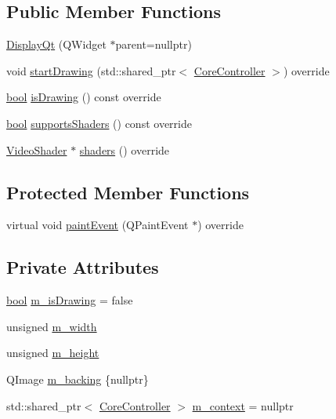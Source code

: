\subsection*{Public Member Functions}
\begin{DoxyCompactItemize}
\item 
\mbox{\hyperlink{class_q_g_b_a_1_1_display_qt_a2ebcca9292027fc84570fd1767cb6aaf}{Display\+Qt}} (Q\+Widget $\ast$parent=nullptr)
\item 
void \mbox{\hyperlink{class_q_g_b_a_1_1_display_qt_adb1dd8630e91d7eb189ea4626fc80465}{start\+Drawing}} (std\+::shared\+\_\+ptr$<$ \mbox{\hyperlink{class_q_g_b_a_1_1_core_controller}{Core\+Controller}} $>$) override
\item 
\mbox{\hyperlink{libretro_8h_a4a26dcae73fb7e1528214a068aca317e}{bool}} \mbox{\hyperlink{class_q_g_b_a_1_1_display_qt_a7c01fcbb5a09686c2e0793039f810c05}{is\+Drawing}} () const override
\item 
\mbox{\hyperlink{libretro_8h_a4a26dcae73fb7e1528214a068aca317e}{bool}} \mbox{\hyperlink{class_q_g_b_a_1_1_display_qt_a48a331d3d100e41168902d62159b9f2f}{supports\+Shaders}} () const override
\item 
\mbox{\hyperlink{video-backend_8h_struct_video_shader}{Video\+Shader}} $\ast$ \mbox{\hyperlink{class_q_g_b_a_1_1_display_qt_a9a92bfeed37ab4ebf5dcad5f573cd9e9}{shaders}} () override
\end{DoxyCompactItemize}
\subsection*{Protected Member Functions}
\begin{DoxyCompactItemize}
\item 
virtual void \mbox{\hyperlink{class_q_g_b_a_1_1_display_qt_a3482e78bcc3c93340cf364ffe57ffa8a}{paint\+Event}} (Q\+Paint\+Event $\ast$) override
\end{DoxyCompactItemize}
\subsection*{Private Attributes}
\begin{DoxyCompactItemize}
\item 
\mbox{\hyperlink{libretro_8h_a4a26dcae73fb7e1528214a068aca317e}{bool}} \mbox{\hyperlink{class_q_g_b_a_1_1_display_qt_ad1b7e6812f698eb280a658deb72ee2b4}{m\+\_\+is\+Drawing}} = false
\item 
unsigned \mbox{\hyperlink{class_q_g_b_a_1_1_display_qt_af80f37bb53492dd016a700988a81830d}{m\+\_\+width}}
\item 
unsigned \mbox{\hyperlink{class_q_g_b_a_1_1_display_qt_abf50393c899793dd6ee939f37a20e43d}{m\+\_\+height}}
\item 
Q\+Image \mbox{\hyperlink{class_q_g_b_a_1_1_display_qt_a39ed336e6d5b179d93b0260d4f27b178}{m\+\_\+backing}} \{nullptr\}
\item 
std\+::shared\+\_\+ptr$<$ \mbox{\hyperlink{class_q_g_b_a_1_1_core_controller}{Core\+Controller}} $>$ \mbox{\hyperlink{class_q_g_b_a_1_1_display_qt_a00538581367822f986e03f8f06e4b01d}{m\+\_\+context}} = nullptr
\end{DoxyCompactItemize}
